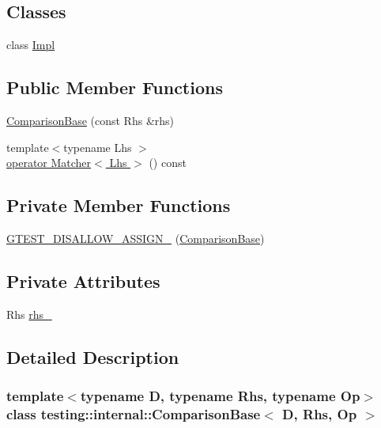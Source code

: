 \subsection*{Classes}
\begin{DoxyCompactItemize}
\item 
class \hyperlink{classtesting_1_1internal_1_1ComparisonBase_1_1Impl}{Impl}
\end{DoxyCompactItemize}
\subsection*{Public Member Functions}
\begin{DoxyCompactItemize}
\item 
\hyperlink{classtesting_1_1internal_1_1ComparisonBase_a365f20e35a604195c869ec0c0bc4c3a3}{Comparison\+Base} (const Rhs \&rhs)
\item 
{\footnotesize template$<$typename Lhs $>$ }\\\hyperlink{classtesting_1_1internal_1_1ComparisonBase_a071cdd47406c2e8df9c89bb99302eab9}{operator Matcher$<$ Lhs $>$} () const
\end{DoxyCompactItemize}
\subsection*{Private Member Functions}
\begin{DoxyCompactItemize}
\item 
\hyperlink{classtesting_1_1internal_1_1ComparisonBase_a57236b1b10c7aa1496e8827609c2489d}{G\+T\+E\+S\+T\+\_\+\+D\+I\+S\+A\+L\+L\+O\+W\+\_\+\+A\+S\+S\+I\+G\+N\+\_\+} (\hyperlink{classtesting_1_1internal_1_1ComparisonBase}{Comparison\+Base})
\end{DoxyCompactItemize}
\subsection*{Private Attributes}
\begin{DoxyCompactItemize}
\item 
Rhs \hyperlink{classtesting_1_1internal_1_1ComparisonBase_ad5d76d60c4599bbdf3da2b2c07e6169d}{rhs\+\_\+}
\end{DoxyCompactItemize}


\subsection{Detailed Description}
\subsubsection*{template$<$typename D, typename Rhs, typename Op$>$\newline
class testing\+::internal\+::\+Comparison\+Base$<$ D, Rhs, Op $>$}



